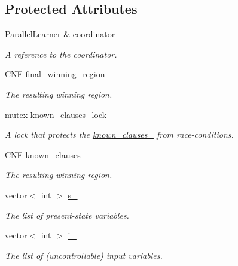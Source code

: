 \subsection*{Protected Attributes}
\begin{DoxyCompactItemize}
\item 
\hyperlink{classParallelLearner}{Parallel\-Learner} \& \hyperlink{classTemplExplorer_af660959dc5cc8c3ceb02389ee8f97753}{coordinator\-\_\-}
\begin{DoxyCompactList}\small\item\em A reference to the coordinator. \end{DoxyCompactList}\item 
\hyperlink{classCNF}{C\-N\-F} \hyperlink{classTemplExplorer_a0fc3d028e5dea077be40f039e559d3d8}{final\-\_\-winning\-\_\-region\-\_\-}
\begin{DoxyCompactList}\small\item\em The resulting winning region. \end{DoxyCompactList}\item 
mutex \hyperlink{classTemplExplorer_ae6051a12b617509a013318f60e51864b}{known\-\_\-clauses\-\_\-lock\-\_\-}
\begin{DoxyCompactList}\small\item\em A lock that protects the \hyperlink{classTemplExplorer_af6b1ce533bff7ad2f4273e2cfc1ddc91}{known\-\_\-clauses\-\_\-} from race-\/conditions. \end{DoxyCompactList}\item 
\hyperlink{classCNF}{C\-N\-F} \hyperlink{classTemplExplorer_af6b1ce533bff7ad2f4273e2cfc1ddc91}{known\-\_\-clauses\-\_\-}
\begin{DoxyCompactList}\small\item\em The resulting winning region. \end{DoxyCompactList}\item 
vector$<$ int $>$ \hyperlink{classTemplExplorer_afcddd3d7d156b0a8e8bc5d077245bd21}{s\-\_\-}
\begin{DoxyCompactList}\small\item\em The list of present-\/state variables. \end{DoxyCompactList}\item 
vector$<$ int $>$ \hyperlink{classTemplExplorer_ad04d957e4f909749c6aba0b31b877431}{i\-\_\-}
\begin{DoxyCompactList}\small\item\em The list of (uncontrollable) input variables. \end{DoxyCompactList}\item 

\end{DoxyCompactItemize}
